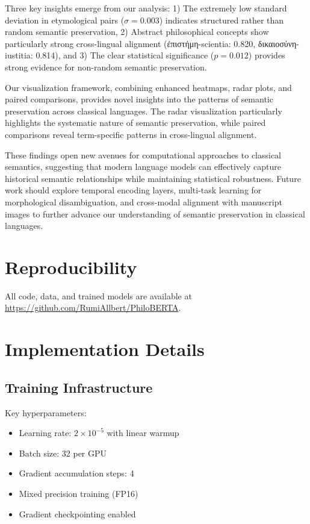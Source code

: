 \documentclass[11pt]{article} %
\begin{document}
Three key insights emerge from our analysis: 1) The extremely low standard deviation in etymological pairs ($\sigma = 0.003$) indicates structured rather than random semantic preservation, 2) Abstract philosophical concepts show particularly strong cross-lingual alignment (\textgreek{ἐπιστήμη}-scientia: 0.820, \textgreek{δικαιοσύνη}-iustitia: 0.814), and 3) The clear statistical significance ($p = 0.012$) provides strong evidence for non-random semantic preservation.

Our visualization framework, combining enhanced heatmaps, radar plots, and paired comparisons, provides novel insights into the patterns of semantic preservation across classical languages. The radar visualization particularly highlights the systematic nature of semantic preservation, while paired comparisons reveal term-specific patterns in cross-lingual alignment.

These findings open new avenues for computational approaches to classical semantics, suggesting that modern language models can effectively capture historical semantic relationships while maintaining statistical robustness. Future work should explore temporal encoding layers, multi-task learning for morphological disambiguation, and cross-modal alignment with manuscript images to further advance our understanding of semantic preservation in classical languages.

\section{Reproducibility}
All code, data, and trained models are available at \url{https://github.com/RumiAllbert/PhiloBERTA}.

\appendix
\section{Implementation Details}
\subsection{Training Infrastructure}
Key hyperparameters:

\begin{itemize}
\item Learning rate: $2 \times 10^{-5}$ with linear warmup
\item Batch size: 32 per GPU
\item Gradient accumulation steps: 4
\item Mixed precision training (FP16)
\item Gradient checkpointing enabled
\end{itemize}


\end{document}

